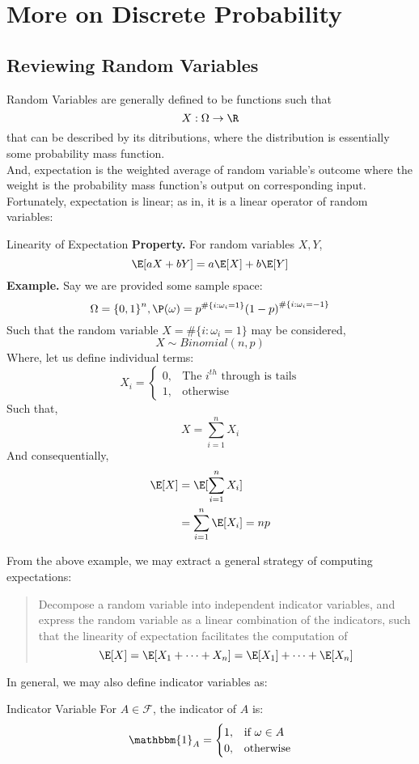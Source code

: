 \chapter{More on Discrete Probability}

\section{Reviewing Random Variables}
Random Variables are generally defined to be functions such that
\[
    X : \Omega \rightarrow \R
\]
that can be described by its ditributions, where the distribution is essentially some probability mass function. \\
And, expectation is the weighted average of random variable's outcome where the weight is the probability mass function's output on corresponding input. Fortunately, expectation is linear; as in, it is a linear operator of random variables:
\begin{ln-explain}{Linearity of Expectation}{}
    \textbf{Property.} For random variables $X, Y$,
    \[
        \E[aX + bY] = a\E[X] + b\E[Y]
    \]
    \tcblower
    \textbf{Example.} Say we are provided some sample space:
    \[\Omega ={\{0, 1\}}^n, \P(\omega) = p^{\#\{i: \omega_i = 1\}} {(1 - p)}^{\#\{i: \omega_i = -1\}}\]
    Such that the random variable $X = \#\{i: \omega_i = 1\}$ may be considered,
    \[X \sim Binomial(n, p)\]
    Where, let us define individual terms:
    \[
        X_i = 
        \begin{cases}
            0, &\text{The $i^{th}$ through is tails} \\
            1, &\text{otherwise}
        \end{cases}
    \]
    Such that,
    \[
        X = \sum_{i = 1}^n X_i
    \]
    And consequentially,
    \begin{align*}
        \E[X]
        &= \E[\sum_{i = 1}^n X_i] \\
        &= \sum_{i = 1}^n \E[X_i] = np
    \end{align*}
\end{ln-explain}
From the above example, we may extract a general strategy of computing expectations:
\begin{quote}
    Decompose a random variable into independent indicator variables, and express the random variable as a linear combination of the indicators, such that the linearity of expectation facilitates the computation of
    \[\E[X] = \E[X_1 + \cdots + X_n] = \E[X_1] + \cdots + \E[X_n]\]
\end{quote}
In general, we may also define indicator variables as:
\begin{ln-symbol}{Indicator Variable}{}
    For $A \in \mathcal{F}$, the indicator of $A$ is:
    \[
        \mathbbm{1}_A = 
        \begin{cases}
            1, &\text{if $\omega \in A$} \\
            0, &\text{otherwise}
        \end{cases}
    \]
\end{ln-symbol}

